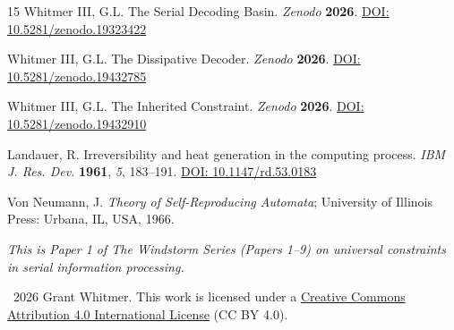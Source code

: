 \documentclass[11pt]{article}
\begin{document}
\begin{thebibliography}{15}
Whitmer III, G.L.
The Serial Decoding Basin.
\textit{Zenodo} \textbf{2026}.
\href{https://doi.org/10.5281/zenodo.19323422}{DOI: 10.5281/zenodo.19323422}

Whitmer III, G.L.
The Dissipative Decoder.
\textit{Zenodo} \textbf{2026}.
\href{https://doi.org/10.5281/zenodo.19432785}{DOI: 10.5281/zenodo.19432785}

Whitmer III, G.L.
The Inherited Constraint.
\textit{Zenodo} \textbf{2026}.
\href{https://doi.org/10.5281/zenodo.19432910}{DOI: 10.5281/zenodo.19432910}

Landauer, R.
Irreversibility and heat generation in the computing process.
\textit{IBM J. Res. Dev.} \textbf{1961}, \textit{5}, 183--191.
\href{https://doi.org/10.1147/rd.53.0183}{DOI: 10.1147/rd.53.0183}

Von Neumann, J.
\textit{Theory of Self-Reproducing Automata};
University of Illinois Press: Urbana, IL, USA, 1966.

\end{thebibliography}

\vspace{2em}
\noindent\textit{This is Paper 1 of The Windstorm Series (Papers 1--9) on universal constraints in serial information processing.}

\vspace{1em}
\noindent\textcopyright~2026 Grant Whitmer. This work is licensed under a \href{https://creativecommons.org/licenses/by/4.0/}{Creative Commons Attribution 4.0 International License} (CC BY 4.0).
\end{document}
